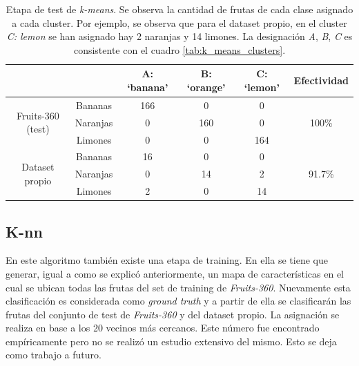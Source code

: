 \documentclass[10pt, a4paper]{article}
\begin{document}
\begin{table}[h]
\begin{center}
\caption{Etapa de test de \textit{k-means}. Se observa la cantidad de frutas de cada clase asignado a cada cluster. Por ejemplo, se observa que para el dataset propio, en el cluster \textit{C: lemon} se han asignado hay 2 naranjas y 14 limones. La designación \textit{A}, \textit{B}, \textit{C} es consistente con el cuadro \ref{tab:k_means_clusters}.}

\begin{tabular}{|c|c|c|c|c|c|}
\hline
                                   &          & A: `banana' & B: `orange' & C: `lemon' & Efectividad             \\ \hline
\multirow{3}{*}{Fruits-360 (test)} & Bananas  & 166         & 0           & 0          & \multirow{3}{*}{100\%}  \\ \cline{2-5}
                                   & Naranjas & 0           & 160         & 0          &                         \\ \cline{2-5}
                                   & Limones  & 0           & 0           & 164        &                         \\ \hline
\multirow{3}{*}{Dataset propio}    & Bananas  & 16          & 0           & 0          & \multirow{3}{*}{91.7\%} \\ \cline{2-5}
                                   & Naranjas & 0           & 14          & 2          &                         \\ \cline{2-5}
                                   & Limones  & 2           & 0           & 14         &                         \\ \hline
\end{tabular}
\label{tab:k_means_test_results}
\end{center}
\end{table}

\subsection{K-nn}

En este algoritmo también existe una etapa de training. En ella se tiene que generar, igual a como se explicó anteriormente, un mapa de características en el cual se ubican todas las frutas del set de training de \textit{Fruits-360}. Nuevamente esta clasificación es considerada como \textit{ground truth} y a partir de ella se clasificarán las frutas del conjunto de test de \textit{Fruits-360} y del dataset propio. La asignación se realiza en base a los 20 vecinos más cercanos. Este número fue encontrado empíricamente pero no se realizó un estudio extensivo del mismo. Esto se deja como trabajo a futuro.
\end{document}
